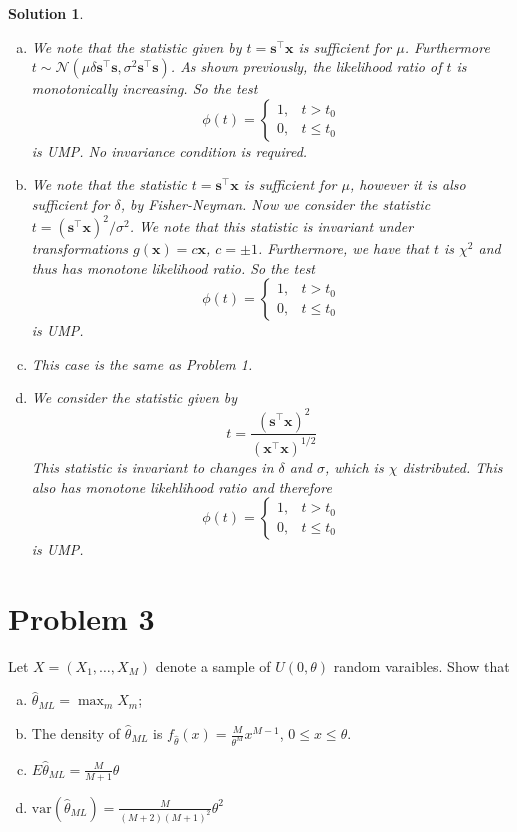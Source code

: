 \documentclass[a4paper]{article}
\newtheorem*{sol}{Solution}
\begin{document}
\begin{sol}
  \begin{enumerate}[a.]
    \item We note that the statistic given by $t = \bm{s}^\top \bm{x}$ is sufficient for $\mu$. Furthermore $t \sim \mathcal{N}(\mu \delta \bm{s}^\top \bm{s}, \sigma^2 \bm{s}^\top \bm{s})$. As shown previously, the likelihood ratio of $t$ is monotonically increasing. So the test
  \[
    \phi(t) 
    = 
    \begin{cases}
      1, & t > t_0 \\
      0, & t \leq t_0
    \end{cases}
  \]
  is UMP. No invariance condition is required.
\item We note that the statistic $t = \bm{s}^\top \bm{x}$ is sufficient for $\mu$, however it is also sufficient for $\delta$, by Fisher-Neyman. Now we consider the statistic $t = (\bm{s}^\top \bm{x})^2/\sigma^2$. We note that this statistic is invariant under transformations $g(\bm{x}) = c \bm{x}$, $c = \pm 1$.  Furthermore, we have that $t$ is $\chi^2$ and thus has monotone likelihood ratio. So the test
  \[
    \phi(t) 
    = 
    \begin{cases}
      1, & t > t_0 \\
      0, & t \leq t_0
    \end{cases}
  \]
  is UMP.
\item This case is the same as Problem 1.
\item We consider the statistic given by
  \[
    t = \frac{(\bm{s}^\top \bm{x})^2}{(\bm{x}^\top \bm{x})^{1/2}}
  \]
  This statistic is invariant to changes in $\delta$ and $\sigma$, which is $\chi$ distributed. This also has monotone likehlihood ratio and therefore
  \[
    \phi(t) 
    = 
    \begin{cases}
      1, & t > t_0 \\
      0, & t \leq t_0
    \end{cases}
  \]
  is UMP.
  \end{enumerate}  
\end{sol}

\section*{Problem 3}%
Let $X = (X_1, \dots, X_M)$ denote a sample of $U(0,\theta)$ random varaibles. Show that
\begin{enumerate}[a.]
  \item $\hat{\theta}_{ML} = \max_m X_m$;
  \item The density of $\hat{\theta}_{ML}$ is $f_{\hat{\theta}}(x) = \frac{M}{\theta^M} x^{M-1}$, $0 \leq x \leq \theta$.
  \item $E \hat{\theta}_{ML} = \frac{M}{M+1} \theta$
  \item $\text{var} (\hat{\theta}_{ML}) = \frac{M}{(M+2)(M+1)^2} \theta^2$
\end{enumerate}
\end{document}
